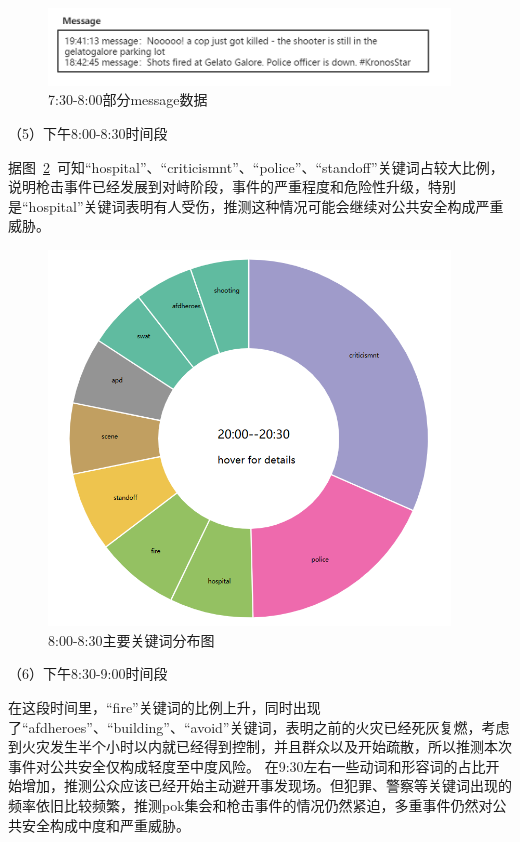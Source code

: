 \documentclass[a4paper]{article}
\begin{document}
\begin{figure}[H]
  \centering
  \includegraphics[width=0.95\textwidth]{images/2-9.png}
  \caption{7:30-8:00部分message数据}\label{fig:2-9}
  \vspace{\baselineskip}
\end{figure}
（5）下午8:00-8:30时间段

据图~\ref{fig:2-10}~可知“hospital”、“criticismnt”、“police”、“standoff”关键词占较大比例，说明枪击事件已经发展到对峙阶段，事件的严重程度和危险性升级，特别是“hospital”关键词表明有人受伤，推测这种情况可能会继续对公共安全构成严重威胁。

\begin{figure}[H]
  \centering
  \includegraphics[width=0.95\textwidth]{images/2-10.png}
  \caption{8:00-8:30主要关键词分布图}\label{fig:2-10}
  \vspace{\baselineskip}
\end{figure}
（6）下午8:30-9:00时间段

在这段时间里，“fire”关键词的比例上升，同时出现了“afdheroes”、“building”、“avoid”关键词，表明之前的火灾已经死灰复燃，考虑到火灾发生半个小时以内就已经得到控制，并且群众以及开始疏散，所以推测本次事件对公共安全仅构成轻度至中度风险。
在9:30左右一些动词和形容词的占比开始增加，推测公众应该已经开始主动避开事发现场。但犯罪、警察等关键词出现的频率依旧比较频繁，推测pok集会和枪击事件的情况仍然紧迫，多重事件仍然对公共安全构成中度和严重威胁。
\end{document}
